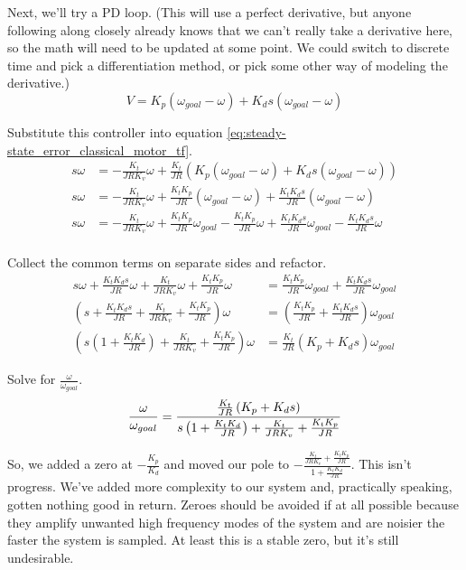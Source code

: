 Next, we'll try a PD loop. (This will use a perfect derivative, but anyone
following along closely already knows that we can't really take a derivative
here, so the math will need to be updated at some point. We could switch to
discrete time and pick a differentiation method, or pick some other way of
modeling the derivative.)
\begin{equation*}
  V = K_p (\omega_{goal} - \omega) + K_d s (\omega_{goal} - \omega)
\end{equation*}

Substitute this controller into equation
\eqref{eq:steady-state_error_classical_motor_tf}.
\begin{align*}
  s \omega &= -\frac{K_t}{JRK_v} \omega + \frac{K_t}{JR}
    \left(K_p (\omega_{goal} - \omega) + K_d s (\omega_{goal} - \omega)\right)
    \\
  s \omega &= -\frac{K_t}{JRK_v} \omega + \frac{K_t K_p}{JR}
    (\omega_{goal} - \omega) + \frac{K_t K_d s}{JR} (\omega_{goal} - \omega) \\
  s \omega &= -\frac{K_t}{JRK_v} \omega + \frac{K_t K_p}{JR} \omega_{goal} -
    \frac{K_t K_p}{JR} \omega + \frac{K_t K_d s}{JR} \omega_{goal} -
    \frac{K_t K_d s}{JR} \omega \\
\end{align*}

Collect the common terms on separate sides and refactor.
\begin{align*}
  s \omega + \frac{K_t K_d s}{JR} \omega + \frac{K_t}{JRK_v} \omega +
    \frac{K_t K_p}{JR} \omega &= \frac{K_t K_p}{JR} \omega_{goal} +
    \frac{K_t K_d s}{JR} \omega_{goal} \\
  \left(s + \frac{K_t K_d s}{JR} + \frac{K_t}{JRK_v} +
    \frac{K_t K_p}{JR}\right) \omega &= \left(\frac{K_t K_p}{JR} +
    \frac{K_t K_d s}{JR}\right) \omega_{goal} \\
  \left(s \left(1 + \frac{K_t K_d}{JR}\right) + \frac{K_t}{JRK_v} +
    \frac{K_t K_p}{JR}\right) \omega &= \frac{K_t}{JR}
    \left(K_p + K_d s\right) \omega_{goal}
\end{align*}

Solve for $\frac{\omega}{\omega_{goal}}$.
\begin{equation*}
  \frac{\omega}{\omega_{goal}} = \frac{\frac{K_t}{JR}\left(K_p + K_d s\right)}
    {s \left(1 + \frac{K_t K_d}{JR}\right) +
      \frac{K_t}{JRK_v} + \frac{K_t K_p}{JR}} \\
\end{equation*}

So, we added a zero at $-\frac{K_p}{K_d}$ and moved our pole to
$-\frac{\frac{K_t}{JRK_v} + \frac{K_t K_p}{JR}}{1 + \frac{K_t K_d}{JR}}$. This
isn't progress. We've added more complexity to our \gls{system} and, practically
speaking, gotten nothing good in return. Zeroes should be avoided if at all
possible because they amplify unwanted high frequency modes of the \gls{system}
and are noisier the faster the \gls{system} is sampled. At least this is a
stable zero, but it's still undesirable.

